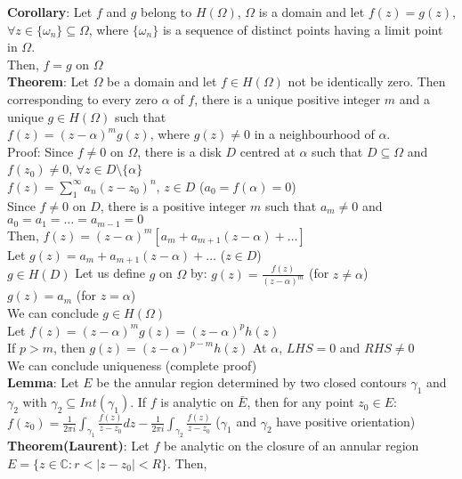 \textbf{Corollary}: Let $f$ and $g$ belong to $H(\Omega)$, $\Omega$ is a domain and let $f(z)=g(z)$, $\forall z\in \{\omega_n\}\subseteq \Omega$, where $\{\omega_n\}$ is a sequence of distinct points having a limit point in $\Omega$.\\
Then, $f=g$ on $\Omega$\\
\textbf{Theorem}: Let $\Omega$ be a domain and let $f\in H(\Omega)$ not be identically zero. Then corresponding to every zero $\alpha$ of $f$, there is a unique positive integer $m$ and a unique $g\in H(\Omega)$ such that \\
$f(z)= (z-\alpha)^mg(z)$, where $g(z)\neq 0$ in a neighbourhood of $\alpha$.\\
Proof: Since $f\neq 0$ on $\Omega$, there is a disk $D$ centred at $\alpha$ such that $D\subseteq \Omega$ and $f(z_0)\neq 0$, $\forall z\in D\setminus\{\alpha\}$\\
$f(z)= \sum_{1}^{\infty} a_n(z-z_0)^n$, $z\in D$ ($a_0=f(\alpha)=0$)\\
Since $f\neq 0$ on $D$, there is a positive integer $m$ such that $a_m\neq 0$ and $a_0=a_1=\dots =a_{m-1}=0$\\
Then, $f(z)=(z-\alpha)^m[a_m+a_{m+1}(z-\alpha)+\dots]$\\
Let $g(z)= a_m+a_{m+1}(z-\alpha)+\dots$  ($z\in D$)\\
$g\in H(D)$
Let us define $g$ on $\Omega$ by:
$g(z)= \frac{f(z)}{(z-\alpha)^m}$ (for $z\neq \alpha$)\\
$g(z)=a_m$ (for $z=\alpha$)\\
We can conclude $g\in H(\Omega)$\\
Let $f(z)=(z-\alpha)^mg(z)=(z-\alpha)^ph(z)$\\
If $p>m$, then $g(z)=(z-\alpha)^{p-m} h(z)$ 
At $\alpha$, $LHS=0$ and $RHS\neq 0$\\
We can conclude uniqueness (complete proof)\\
\textbf{Lemma}: Let $E$ be the annular region determined by two closed contours $\gamma_1$ and $\gamma_2$ with $\gamma_2\subseteq Int(\gamma_1)$. If $f$ is analytic on $\bar{E}$, then for any point $z_0\in E$:\\
$f(z_0)=\frac{1}{2\pi i} \int_{\gamma_1}^{} \frac{f(z)}{z-z_0} dz - \frac{1}{2\pi i}\int_{\gamma_2}^{} \frac{f(z)}{z-z_0}$ ($\gamma_1$ and $\gamma_2$ have positive orientation)\\
\textbf{Theorem(Laurent)}: Let $f$ be analytic on the closure of an annular region $E=\{z\in \mathbb{C}: r<|z-z_0|<R\}$. Then,
